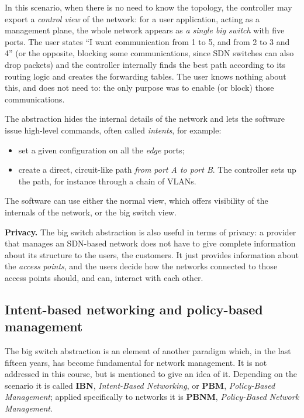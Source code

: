 \begin{center}
\end{center}

In this scenario, when there is no need to know the topology, the controller may export a \emph{control view} of the network: for a user application, acting as a management plane, the whole network appears as \emph{a single big switch} with five ports. The user states ``I want communication from 1 to 5, and from 2 to 3 and 4'' (or the opposite, blocking some communications, since SDN switches can also drop packets) and the controller internally finds the best path according to its routing logic and creates the forwarding tables. The user knows nothing about this, and does not need to: the only purpose was to enable (or block) those communications.

The abstraction hides the internal details of the network and lets the software issue high-level commands, often called \emph{intents}, for example:

\begin{itemize}
\item set a given configuration on all the \emph{edge} ports;
\item create a direct, circuit-like path \emph{from port A to port B}. The controller sets up the path, for instance through a chain of VLANs.
\end{itemize}

The software can use either the normal view, which offers visibility of the internals of the network, or the big switch view.

\begin{notebox}
	\textbf{Privacy.} The big switch abstraction is also useful in terms of privacy: a provider that manages an SDN-based network does not have to give complete information about its structure to the users, the customers. It just provides information about the \emph{access points}, and the users decide how the networks connected to those access points should, and can, interact with each other.
\end{notebox}

\subsection{Intent-based networking and policy-based management}

The big switch abstraction is an element of another paradigm which, in the last fifteen years, has become fundamental for network management. It is not addressed in this course, but is mentioned to give an idea of it. Depending on the scenario it is called \textbf{IBN}, \emph{Intent-Based Networking}, or \textbf{PBM}, \emph{Policy-Based Management}; applied specifically to networks it is \textbf{PBNM}, \emph{Policy-Based Network Management}.

